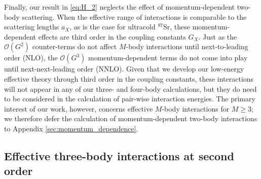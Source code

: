 \documentclass[preprint,showkeys,nofootinbib]{revtex4-1}
\newcommand{\p}[1]{\left(#1\right)} %
\renewcommand{\O}{\mathcal{O}}
\newcommand{\1}{\mathds{1}}
\begin{document}
Finally, our result in \eqref{eq:H_2} neglects the effect of
momentum-dependent two-body scattering.  When the effective range of
interactions is comparable to the scattering lengths $a_X$, as is the
case for ultracold ${}^{87}$Sr, these momentum-dependent effects are
third order in the coupling constants $G_X$.  Just as the $\O\p{G^2}$
counter-terms do not affect $M$-body interactions until
next-to-leading order (NLO), the $\O\p{G^3}$ momentum-dependent terms
do not come into play until next-next-leading order (NNLO).  Given
that we develop our low-energy effective theory through third order in
the coupling constants, these interactions will not appear in any of
our three- and four-body calculations, but they do need to be
considered in the calculation of pair-wise interaction energies.  The
primary interest of our work, however, concerns effective $M$-body
interactions for $M\ge3$; we therefore defer the calculation of
momentum-dependent two-body interactions to Appendix
\ref{sec:momentum_dependence}.


\subsection{Effective three-body interactions at second order}
\end{document}
